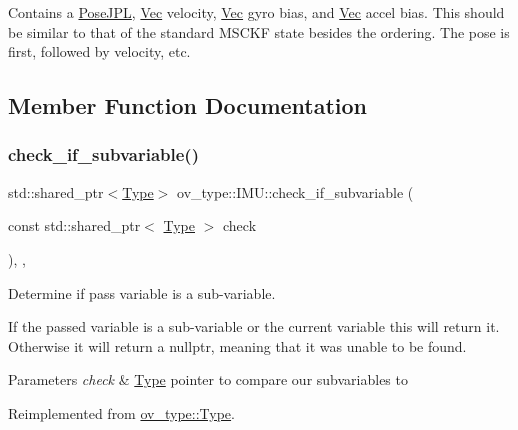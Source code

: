 Contains a \hyperlink{classov__type_1_1PoseJPL}{Pose\+J\+PL}, \hyperlink{classov__type_1_1Vec}{Vec} velocity, \hyperlink{classov__type_1_1Vec}{Vec} gyro bias, and \hyperlink{classov__type_1_1Vec}{Vec} accel bias. This should be similar to that of the standard M\+S\+C\+KF state besides the ordering. The pose is first, followed by velocity, etc. 

\subsection{Member Function Documentation}
\mbox{\label{classov__type_1_1IMU_a3fb9631390473158abcdf97c71ea6e16}} 
\subsubsection{\texorpdfstring{check\+\_\+if\+\_\+subvariable()}{check\_if\_subvariable()}}
{\footnotesize\ttfamily std\+::shared\+\_\+ptr$<$\hyperlink{classov__type_1_1Type}{Type}$>$ ov\+\_\+type\+::\+I\+M\+U\+::check\+\_\+if\+\_\+subvariable (\begin{DoxyParamCaption}\item[{const std\+::shared\+\_\+ptr$<$ \hyperlink{classov__type_1_1Type}{Type} $>$}]{check }\end{DoxyParamCaption})\hspace{0.3cm}{\ttfamily [inline]}, {\ttfamily [override]}, {\ttfamily [virtual]}}



Determine if pass variable is a sub-\/variable. 

If the passed variable is a sub-\/variable or the current variable this will return it. Otherwise it will return a nullptr, meaning that it was unable to be found.


\begin{DoxyParams}{Parameters}
{\em check} & \hyperlink{classov__type_1_1Type}{Type} pointer to compare our subvariables to \\
\hline
\end{DoxyParams}


Reimplemented from \hyperlink{classov__type_1_1Type_a95fcdbc584256baffc78935de5ab5da3}{ov\+\_\+type\+::\+Type}.

